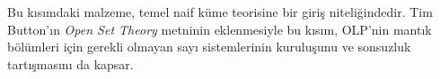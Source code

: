 \documentclass[../../include/open-logic-part]{subfiles}
\begin{document}

\begin{editorial}
  Bu kısımdaki malzeme, temel naif küme teorisine bir giriş niteliğindedir.
  Tim Button'ın \emph{Open Set Theory} metninin eklenmesiyle bu kısım, OLP'nin
  mantık bölümleri için gerekli olmayan sayı sistemlerinin kuruluşunu ve
  sonsuzluk tartışmasını da kapsar.
\end{editorial}







\OLEndPartHook
\end{document}
